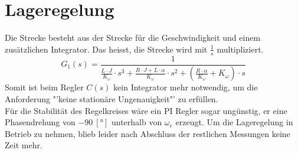 \section{Lageregelung}
Die Strecke besteht aus der Strecke für die Geschwindigkeit und einem 
zusätzlichen Integrator. Das heisst, die Strecke wird mit $\frac{1}{s}$ 
multipliziert. 
\[
    G_1(s) = \frac{1}{ \frac{L \cdot J}{K_\omega} \cdot s^3
        + \frac{R \cdot J + L \cdot \alpha}{K_\omega} \cdot s^2
        + \left(\frac{R \cdot \alpha}{K_\omega} + K_\omega\right) \cdot s
    }
\]
Somit ist beim Regler $C(s)$ kein Integrator mehr notwendig, um die Anforderung 
"'keine stationäre Ungenauigkeit"' zu erfüllen. \\
Für die Stabilität des Regelkreises wäre ein PI Regler sogar ungünstig, er 
eine Phasendrehung von $-90~[\si{\degree}]$ unterhalb von $\omega_e$ erzeugt. 
Um die Lageregelung in Betrieb zu nehmen, blieb leider nach Abschluss der 
restlichen Messungen keine Zeit mehr. \\
